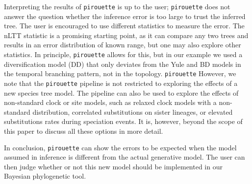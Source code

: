 Interpreting the results of \verb;pirouette; is up to the user; 
\verb;pirouette; does not answer the question 
whether the inference error is too large to trust the inferred tree. The user is encouraged to use different statistics to measure the error. The nLTT statistic is
a promising starting point, as it can compare any two trees and 
results in an error distribution of known range, but one may also explore other statistics.
In principle, \verb;pirouette; allows for this, but in our example we used a diversification model (DD) that only deviates from the Yule and BD models in the temporal branching pattern, not in the topology.
    \verb;pirouette;
However, we note that the \verb;pirouette; pipeline is not restricted 
to exploring the effects of a new species tree model. 
The pipeline can also be used to explore the effects of non-standard 
clock or site models, such as relaxed clock models with a non-standard 
distribution, correlated substitutions on sister lineages, or elevated 
substitutions rates during speciation events. 
It is, however, beyond the scope of this paper to discuss all these options 
in more detail.

In conclusion, \verb;pirouette; can show the errors to be expected
when the model assumed in inference is different from the 
actual generative model.
The user can then judge whether or not this new model 
should be implemented in our Bayesian phylogenetic tool. 





